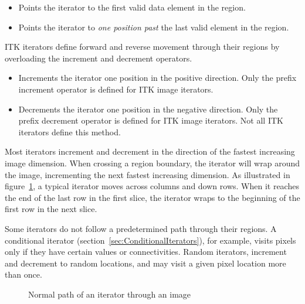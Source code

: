 \begin{itemize}
\item \textbf{} Points the iterator to the first valid
data element in the region.

\item \textbf{} Points the iterator to \emph{one position past}
the last valid element in the region.
\end{itemize}

ITK iterators define forward and reverse movement through their regions by
overloading the increment and decrement operators.

\begin{itemize}
\item \textbf{} Increments the iterator one position in the
positive direction.  Only the prefix increment operator is defined for ITK image
iterators.

\item \textbf{} Decrements the iterator one position in the
negative direction.  Only the prefix decrement operator is defined for ITK
image iterators. Not all ITK iterators define this method.
\end{itemize}

Most iterators increment and decrement in the direction of the fastest
increasing image dimension.  When crossing a region boundary, the iterator will
wrap around the image, incrementing the next fastest increasing dimension.
As illustrated in figure~{\ref{fig:WalkingIterator}}, a typical iterator moves
across columns and down rows.  When it reaches the end of the last row in the
first slice, the iterator wraps to the beginning of the first row in the next
slice.  

Some iterators do not follow a predetermined path through their regions.  A
conditional iterator (section~\ref{sec:ConditionalIterators}), for example,
visits pixels only if they have certain values or connectivities.  Random
iterators, increment and decrement to random locations, and may visit a given
pixel location more than once.

\begin{figure}
\centering
\caption[Normal iterator path.]{Normal path of an iterator through an image}
\protect\label{fig:WalkingIterator}
\end{figure}

